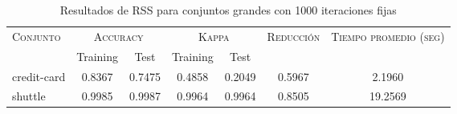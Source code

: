\begin{table}[]
\centering
\begin{tabular}{l c c c c c c}
\hline
\multirow{2}{*}{\textsc{Conjunto}}
	& \multicolumn{2}{c}{\textsc{Accuracy}}
	& \multicolumn{2}{c}{\textsc{Kappa}}
	& \textsc{Reducción}
	& \textsc{Tiempo promedio (seg)} \\
	& Training & Test
	& Training & Test \\ 
\hline
\hline

credit-card & 0.8367 & 0.7475 & 0.4858 & 0.2049 & 0.5967 & 2.1960 \\
shuttle & 0.9985 & 0.9987 & 0.9964 & 0.9964 & 0.8505 & 19.2569 \\

\hline
\end{tabular}
\caption{Resultados de RSS para conjuntos grandes con 1000 iteraciones fijas}
\label{res-large-RSS}
\end{table}

\clearpage


